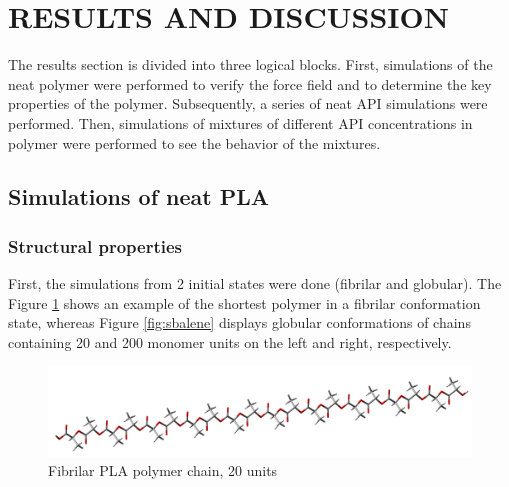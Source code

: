 \newpage
\section{RESULTS AND DISCUSSION}

The results section is divided into three logical blocks. First, simulations of the neat polymer were performed to verify the force field and to determine the key properties of the polymer. Subsequently, a series of neat API simulations were performed. Then, simulations of mixtures of different API concentrations in polymer were performed to see the behavior of the mixtures.  
\vspace{-0.2cm}
\subsection{Simulations of neat PLA}
\subsubsection{Structural properties}
\vspace{-0.2cm}
First, the simulations from 2 initial states were done (fibrilar and globular). The Figure \ref{fig:linearni} shows an example of the shortest polymer in a fibrilar conformation state, whereas Figure \ref{fig:sbalene} displays globular conformations of chains containing 20 and 200 monomer units on the left and right, respectively.\vspace{-0.2cm}

\begin{figure}[htb]
	\centering
	\includegraphics[width=0.9\linewidth]{img/pla_10d_tube.png}
	\caption{Fibrilar PLA polymer chain, 20 units}
	\label{fig:linearni}
\end{figure}

